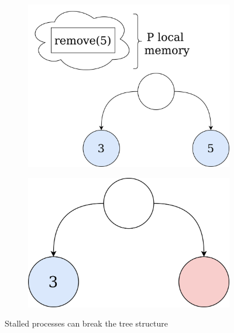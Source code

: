 \documentclass[times, dvipsnames,%
               languages={russian,english} %
              ]{itmo-student-thesis}
\begin{document}
\begin{figure}[H]
\begin{subfigure}[b]{0.45\linewidth}
          \label{create-ts-3-pic}
     \end{subfigure}
     \hfill
     \begin{subfigure}[b]{0.45\linewidth}
          \centering
          \includegraphics[width=\linewidth]{pics/create-ts-4.png}
          \label{create-ts-4-pic}
     \end{subfigure}
     \hfill
     \begin{subfigure}[b]{0.45\linewidth}
          \centering
          \includegraphics[width=\linewidth]{pics/create-ts-5.png}
          \label{create-ts-5-pic}
     \end{subfigure}
    \caption{Stalled processes can break the tree structure}
    \label{create-ts-pic}
\end{figure}
\end{document}
